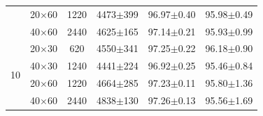 \begin{table}[!t]
\begin{tabular}{cccccc}
 & 20$\times$60 & 1220 & 4473$\pm$399 & 96.97$\pm$0.40 & 95.98$\pm$0.49 \\
 & 40$\times$60 & 2440 & 4625$\pm$165 & 97.14$\pm$0.21 & 95.93$\pm$0.99 \\
\midrule
\multirow{4}{*}{10} & 20$\times$30 & 620 & 4550$\pm$341 & 97.25$\pm$0.22 & 96.18$\pm$0.90 \\
 & 40$\times$30 & 1240 & 4441$\pm$224 & 96.92$\pm$0.25 & 95.46$\pm$0.84 \\
 & 20$\times$60 & 1220 & 4664$\pm$285 & 97.23$\pm$0.11 & 95.80$\pm$1.36 \\
 & 40$\times$60 & 2440 & 4838$\pm$130 & 97.26$\pm$0.13 & 95.56$\pm$1.69 \\
\hline\toprule
\end{tabular}
\end{table}
